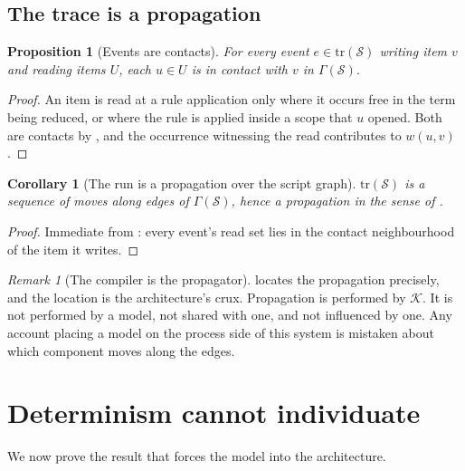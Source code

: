 \documentclass[twocolumn,11pt,a4paper]{article}
\theoremstyle{sup}
\newtheorem{proposition}[theorem]{Proposition}
\newtheorem{corollary}[theorem]{Corollary}
\theoremstyle{definition}
\theoremstyle{remark}
\newtheorem{remark}[theorem]{Remark}
\newcommand{\Gph}{\Gamma}
\newcommand{\wt}{w}
\newcommand{\Src}{\mathcal{S}}
\newcommand{\Cmp}{\mathcal{K}}
\newcommand{\Tr}{\mathrm{tr}}
\begin{document}
\subsection{The trace is a propagation}

\begin{proposition}[Events are contacts]
\label{prop:events-contacts}
For every event $e\in\Tr(\Src)$ writing item $v$ and reading items $U$, each
$u\in U$ is in contact with $v$ in $\Gph(\Src)$.
\end{proposition}

\begin{proof}
An item is read at a rule application only where it occurs free in the term
being reduced, or where the rule is applied inside a scope that $u$ opened.
Both are contacts by , and the occurrence witnessing the read
contributes to $\wt(u,v)$.
\end{proof}

\begin{corollary}[The run is a propagation over the script graph]
\label{cor:run-is-prop}
$\Tr(\Src)$ is a sequence of moves along edges of $\Gph(\Src)$, hence a
propagation in the sense of \citet{sachikonye2025directional}.
\end{corollary}

\begin{proof}
Immediate from : every event's read set lies in the
contact neighbourhood of the item it writes.
\end{proof}

\begin{remark}[The compiler is the propagator]
\label{rem:compiler-propagates}
 locates the propagation precisely, and the location is
the architecture's crux. Propagation is performed by $\Cmp$. It is not
performed by a model, not shared with one, and not influenced by one. Any
account placing a model on the process side of this system is mistaken about
which component moves along the edges.
\end{remark}

\section{Determinism cannot individuate}
\label{sec:individuate}

We now prove the result that forces the model into the architecture.
\end{document}
